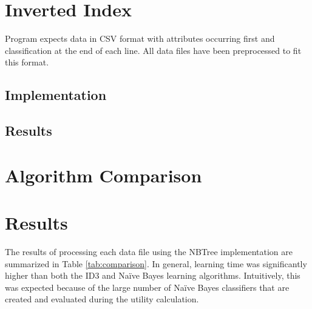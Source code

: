 \documentclass[10pt]{report}
\begin{document}
\section{Inverted Index}
Program expects data in CSV format with attributes occurring first and
classification at the end of each line. All data files have been
preprocessed to fit this format.


\subsection*{Implementation}


\subsection*{Results}



\section{Algorithm Comparison}





\section{Results}
\label{sec:results}
The results of processing each data file using the NBTree
implementation are summarized in Table 
\ref{tab:comparison}. In general, learning time was significantly
higher than both the ID3 and Na\"{i}ve Bayes learning
algorithms. Intuitively, this was expected because of the large number
of Na\"{i}ve Bayes classifiers that are created and evaluated during
the utility calculation.
\end{document}
